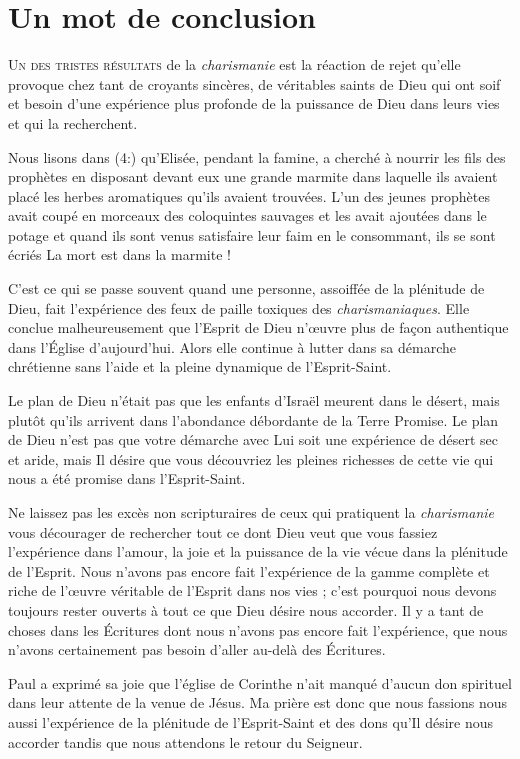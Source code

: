\chapter{Un mot de conclusion}

\lettrine{U}{n des tristes résultats} de la \emph{charismanie}
 est la réaction de rejet
 qu'elle provoque chez tant de croyants sincères, de véritables saints de Dieu
 qui ont soif et besoin d'une expérience 
 plus profonde de la puissance de Dieu
 dans leurs vies et qui la recherchent.

Nous lisons dans (4:) qu'Elisée, pendant la famine,
 a cherché à nourrir les fils des prophètes en disposant devant eux
 une grande marmite dans laquelle ils avaient placé les herbes
 aromatiques qu'ils avaient trouvées.
 L'un des jeunes prophètes avait coupé en morceaux des coloquintes
 sauvages et les avait ajoutées dans le potage et quand ils sont venus
 satisfaire leur faim en le consommant, ils se sont écriés\frcolon{}
 \Og La mort est dans la marmite ! \Fg{}

C'est ce qui se passe souvent quand une personne,
 assoiffée de la plénitude de Dieu, fait l'expérience 
 des feux de paille toxiques
 des \emph{charismaniaques}. Elle conclue malheureusement
 que l'Esprit de Dieu n'œuvre plus de façon authentique
 dans l'Église d'aujourd'hui. Alors elle continue à lutter
 dans sa démarche chrétienne sans l'aide et la pleine dynamique
 de l'Esprit-Saint.

Le plan de Dieu n'était pas que les enfants d'Israël meurent
 dans le désert, mais plutôt qu'ils arrivent dans l'abondance débordante
 de la Terre Promise. Le plan de Dieu n'est pas que votre démarche
 avec Lui soit une expérience  de désert sec et aride,
 mais Il désire
 que vous découvriez les pleines richesses de cette vie
 qui nous a été promise dans l'Esprit-Saint.

Ne laissez pas les excès non scripturaires de ceux qui pratiquent
 la \emph{charismanie} vous décourager de rechercher tout ce dont Dieu
 veut que vous fassiez l'expérience  dans l'amour,
 la joie et la puissance de la vie vécue dans la plénitude de l'Esprit.
 Nous n'avons pas encore fait l'expérience 
 de la gamme complète
 et riche de l'œuvre véritable de l'Esprit dans nos vies ;
 c'est pourquoi nous devons toujours rester ouverts
 à tout ce que Dieu désire nous accorder.
 Il y a tant de choses dans les Écritures dont nous n'avons pas encore
 fait l'expérience, 
 que nous n'avons certainement pas besoin
 d'aller au-delà des Écritures.

Paul a exprimé sa joie que l'église de Corinthe n'ait manqué
 d'aucun don spirituel dans leur attente de la venue de Jésus.
 Ma prière est donc que nous fassions
 nous aussi l'expérience 
 de la plénitude de l'Esprit-Saint et des dons qu'Il désire
 nous accorder tandis que nous attendons le retour du Seigneur.
\closechapter


